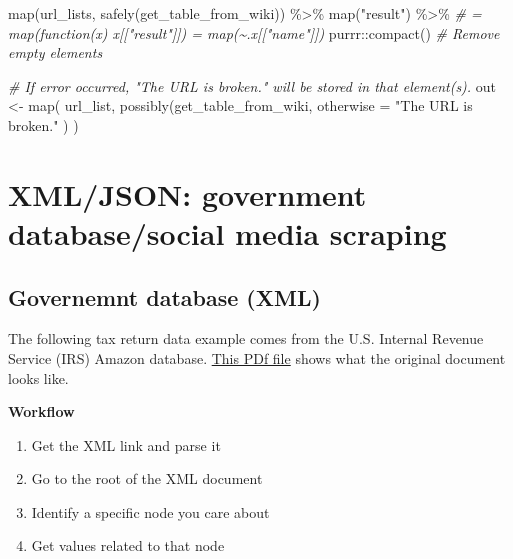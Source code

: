 \documentclass[
]{book}
\newenvironment{Shaded}{\begin{snugshade}}{\end{snugshade}}
\newcommand{\AttributeTok}[1]{\textcolor[rgb]{0.77,0.63,0.00}{#1}}
\newcommand{\CommentTok}[1]{\textcolor[rgb]{0.56,0.35,0.01}{\textit{#1}}}
\newcommand{\FunctionTok}[1]{\textcolor[rgb]{0.00,0.00,0.00}{#1}}
\newcommand{\NormalTok}[1]{#1}
\newcommand{\OtherTok}[1]{\textcolor[rgb]{0.56,0.35,0.01}{#1}}
\newcommand{\SpecialCharTok}[1]{\textcolor[rgb]{0.00,0.00,0.00}{#1}}
\newcommand{\StringTok}[1]{\textcolor[rgb]{0.31,0.60,0.02}{#1}}
\providecommand{\tightlist}{%
  \setlength{\itemsep}{0pt}\setlength{\parskip}{0pt}}
\begin{document}
\begin{Shaded}
\begin{Highlighting}[]
\FunctionTok{map}\NormalTok{(url\_lists, }\FunctionTok{safely}\NormalTok{(get\_table\_from\_wiki)) }\SpecialCharTok{\%\textgreater{}\%}
  \FunctionTok{map}\NormalTok{(}\StringTok{"result"}\NormalTok{) }\SpecialCharTok{\%\textgreater{}\%} 
  \CommentTok{\# = map(function(x) x[["result"]]) = map(\textasciitilde{}.x[["name"]])}
\NormalTok{  purrr}\SpecialCharTok{::}\FunctionTok{compact}\NormalTok{() }\CommentTok{\# Remove empty elements}
\end{Highlighting}
\end{Shaded}

\begin{Shaded}
\begin{Highlighting}[]
\CommentTok{\# If error occurred, "The URL is broken." will be stored in that element(s).}
\NormalTok{out }\OtherTok{\textless{}{-}} \FunctionTok{map}\NormalTok{(}
\NormalTok{  url\_list,}
  \FunctionTok{possibly}\NormalTok{(get\_table\_from\_wiki,}
    \AttributeTok{otherwise =} \StringTok{"The URL is broken."}
\NormalTok{  )}
\NormalTok{)}
\end{Highlighting}
\end{Shaded}

\hypertarget{xmljson-government-databasesocial-media-scraping}{%
\section{XML/JSON: government database/social media scraping}\label{xmljson-government-databasesocial-media-scraping}}

\hypertarget{governemnt-database-xml}{%
\subsection{Governemnt database (XML)}\label{governemnt-database-xml}}

The following tax return data example comes from the U.S. Internal Revenue Service (IRS) Amazon database. \href{https://www.irs.gov/pub/irs-pdf/f990.pdf}{This PDf file} shows what the original document looks like.

\textbf{Workflow}

\begin{enumerate}
\def\labelenumi{\arabic{enumi}.}
\tightlist
\item
  Get the XML link and parse it
\item
  Go to the root of the XML document
\item
  Identify a specific node you care about
\item
  Get values related to that node
\end{enumerate}
\end{document}
